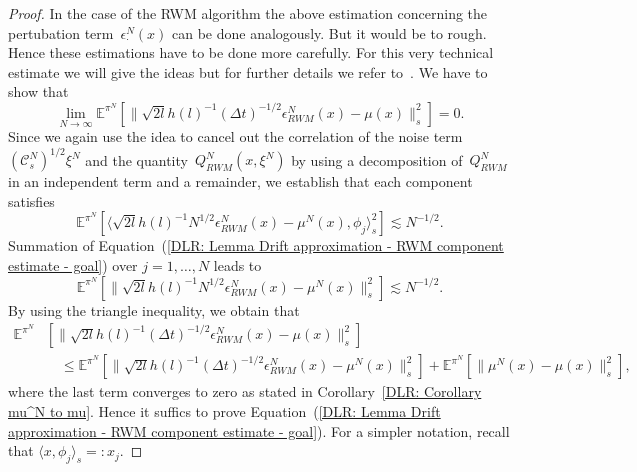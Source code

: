 \begin{proof}
 In the case of the RWM algorithm the above estimation concerning the pertubation term~$\epsilon_{\cdot}^N (x)$ can be done analogously. But it would be to rough. Hence these estimations have to be done more carefully. For this very technical estimate we will give the ideas but for further details we refer to~\autocite{Mattingly2010}. We have to show that 
 \begin{equation}
   \label{DLR: Lemma Drift approximation - RWM estimate - goal}
   \lim_{N \to \infty} \mathbb{E}^{\pi^N}[ \|  \sqrt{2l}h(l)^{-1} (\Delta t)^{-1/2} \epsilon_{RWM}^N (x)  - \mu(x) \|_{s}^2 ] = 0.
 \end{equation}
 Since we again use the idea to cancel out the correlation of the noise term~$ (\mathcal{C}_s^N)^{1/2} \xi^N$ and the quantity~$ Q^N_{RWM}(x, \xi^N)$ by using a decomposition of~$ Q^N_{RWM}$ in an independent term and a remainder, we establish that each component satisfies
 \begin{equation}
   \label{DLR: Lemma Drift approximation - RWM component estimate - goal}
    \mathbb{E}^{\pi^N}[ \langle \sqrt{2l}h(l)^{-1} N^{1/2} \epsilon_{RWM}^N (x)  - \mu^N(x) , \phi_j \rangle_s^2] \lesssim N^{-1/2}.
 \end{equation}
 Summation of Equation~(\ref{DLR: Lemma Drift approximation - RWM component estimate - goal}) over $j = 1, \dots, N$ leads to 
 \begin{equation}
  \label{DLR: Lemma Drift approximation - RWM estimate almost - goal}
  \mathbb{E}^{\pi^N}[ \|  \sqrt{2l}h(l)^{-1} N^{1/2} \epsilon_{RWM}^N (x)  - \mu^N(x) \|_{s}^2 ] \lesssim  N^{-1/2}.
 \end{equation}
 By using the triangle inequality, we obtain that
 \begin{align*}
  \mathbb{E}^{\pi^N} & [ \|  \sqrt{2l}h(l)^{-1} (\Delta t)^{-1/2} \epsilon_{RWM}^N (x)  - \mu(x) \|_{s}^2 ] \\
  & \quad \leq  \mathbb{E}^{\pi^N}  [ \|  \sqrt{2l}h(l)^{-1} (\Delta t)^{-1/2} \epsilon_{RWM}^N (x)  - \mu^N(x) \|_{s}^2 ] +  \mathbb{E}^{\pi^N}  [ \|  \mu^N (x)  - \mu(x) \|_{s}^2 ],
 \end{align*}
 where the last term converges to zero as stated in Corollary~\ref{DLR: Corollary mu^N to mu}. Hence it suffics to prove Equation~(\ref{DLR: Lemma Drift approximation - RWM component estimate - goal}). For a simpler notation, recall that $\langle x, \phi_j \rangle_s =: x_j$.



\end{proof}

